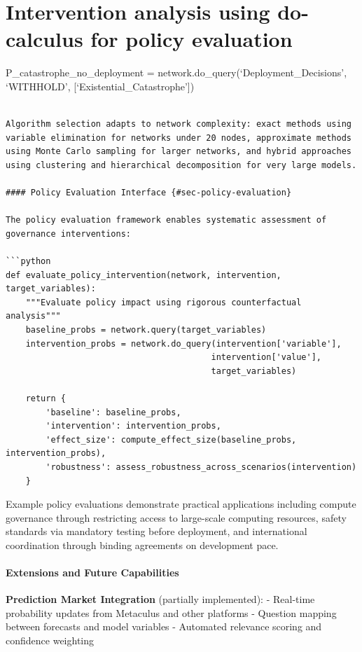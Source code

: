 \documentclass[
  11pt,
  letterpaper,
]{book}
\begin{document}
\chapter{Intervention analysis using do-calculus for policy
evaluation}\label{intervention-analysis-using-do-calculus-for-policy-evaluation}

P\_catastrophe\_no\_deployment =
network.do\_query(`Deployment\_Decisions', `WITHHOLD',
{[}`Existential\_Catastrophe'{]})

\begin{verbatim}

Algorithm selection adapts to network complexity: exact methods using variable elimination for networks under 20 nodes, approximate methods using Monte Carlo sampling for larger networks, and hybrid approaches using clustering and hierarchical decomposition for very large models.

#### Policy Evaluation Interface {#sec-policy-evaluation}

The policy evaluation framework enables systematic assessment of governance interventions:

```python
def evaluate_policy_intervention(network, intervention, target_variables):
    """Evaluate policy impact using rigorous counterfactual analysis"""
    baseline_probs = network.query(target_variables)
    intervention_probs = network.do_query(intervention['variable'], 
                                         intervention['value'],
                                         target_variables)
    
    return {
        'baseline': baseline_probs,
        'intervention': intervention_probs, 
        'effect_size': compute_effect_size(baseline_probs, intervention_probs),
        'robustness': assess_robustness_across_scenarios(intervention)
    }
\end{verbatim}

Example policy evaluations demonstrate practical applications including
compute governance through restricting access to large-scale computing
resources, safety standards via mandatory testing before deployment, and
international coordination through binding agreements on development
pace.

\subsubsection{Extensions and Future Capabilities}\label{sec-extensions}

\textbf{Prediction Market Integration} (partially implemented): -
Real-time probability updates from Metaculus and other platforms -
Question mapping between forecasts and model variables - Automated
relevance scoring and confidence weighting
\end{document}
